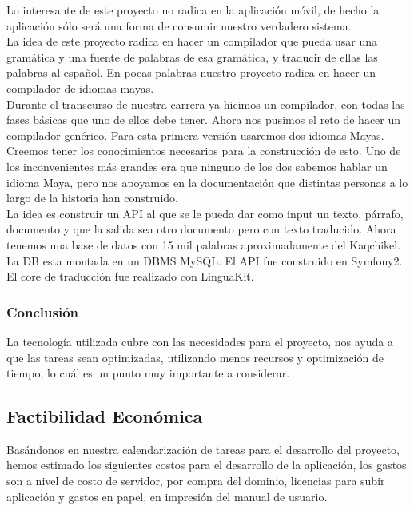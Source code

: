 \documentclass[a4paper,openright,11pt]{article}
\begin{document}
Lo interesante de este proyecto no radica en la aplicaci\'on m\'ovil, de hecho la aplicaci\'on s\'olo ser\'a una forma de consumir nuestro verdadero sistema.\\

La idea de este proyecto radica en hacer un compilador que pueda usar una gram\'atica y una fuente de palabras de esa gram\'atica, y traducir de ellas las palabras al español. En pocas palabras nuestro proyecto radica en hacer un compilador de idiomas mayas.\\

Durante el transcurso de nuestra carrera ya hicimos un compilador, con todas las fases b\'asicas que uno de ellos debe tener. Ahora nos pusimos el reto de hacer un compilador gen\'erico. Para esta primera versi\'on usaremos dos idiomas Mayas.\\

Creemos tener los conocimientos necesarios para la construcci\'on de esto. Uno de los inconvenientes m\'as grandes era que ninguno de los dos sabemos hablar un idioma Maya, pero nos apoyamos en la documentaci\'on que distintas personas a lo largo de la historia han construido.\\ 

La idea es construir un API al que se le pueda dar como input un texto, p\'arrafo, documento y que la salida sea otro documento pero con texto traducido. Ahora tenemos una base de datos con 15 mil palabras aproximadamente del Kaqchikel. La DB esta montada en un DBMS MySQL. El API fue construido en Symfony2. El core de traducci\'on fue realizado con LinguaKit.

\subsubsection{Conclusión}
La tecnología utilizada cubre con las necesidades para el proyecto, nos ayuda a que las tareas sean optimizadas, utilizando menos recursos y optimización de tiempo, lo cuál es un punto muy importante a considerar.

\subsection{Factibilidad Econ\'omica}
Bas\'andonos en nuestra calendarizaci\'on de tareas para el desarrollo del proyecto, hemos estimado los siguientes costos para el desarrollo de la aplicaci\'on, los gastos son a nivel de costo de servidor, por compra del dominio, licencias para subir aplicaci\'on y gastos en papel, en impresi\'on del manual de usuario.\\
\end{document}
